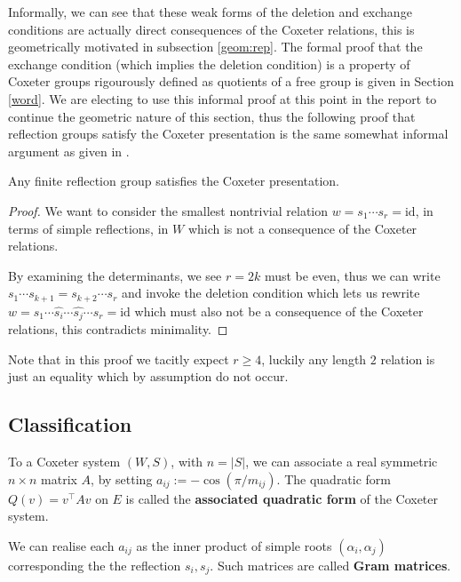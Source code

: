 \documentclass[../main.tex]{subfiles}
\begin{document}
Informally, we can see that these weak forms of the deletion and exchange conditions are actually direct consequences of the Coxeter relations, this is geometrically motivated in subsection \ref{geom:rep}. The formal proof that the exchange condition (which implies the deletion condition) is a property of Coxeter groups rigourously defined as quotients of a free group is given in Section \ref{word}. We are electing to use this informal proof at this point in the report to continue the geometric nature of this section, thus the following proof that reflection groups satisfy the Coxeter presentation is the same somewhat informal argument as given in \cite{Humphreys1990}.

\begin{theorem}
    Any finite reflection group satisfies the Coxeter presentation.
    \begin{proof}
        We want to consider the smallest nontrivial relation $w=s_1\cdots s_r = \text{id}$, in terms of simple reflections, in $W$ which is not a consequence of the Coxeter relations.

        By examining the determinants, we see $r=2k$ must be even, thus we can write $s_1\cdots s_{k+1} = s_{k+2}\cdots s_r$ and invoke the deletion condition which lets us rewrite $w=s_1\cdots \hat{s_i}\cdots \hat{s_j}\cdots s_r =\text{id}$ which must also not be a consequence of the Coxeter relations, this contradicts minimality.
    \end{proof}
\end{theorem}

Note that in this proof we tacitly expect $r\geq 4$, luckily any length $2$ relation is just an equality which by assumption do not occur.

\subsection{Classification}

\begin{definition}
    To a Coxeter system $(W,S)$, with $n=|S|$, we can associate a real symmetric $n\times n$ matrix $A$, by setting $a_{ij}:= -\cos(\pi/m_{ij})$. The quadratic form $Q(v) = v^\top A v$ on $E$ is called the \textbf{associated quadratic form} of the Coxeter system.
\end{definition}

We can realise each $a_{ij}$ as the inner product of simple roots $(\alpha_i,\alpha_j)$ corresponding the the reflection $s_i,s_j$. Such matrices are called \textbf{Gram matrices}.
\end{document}
